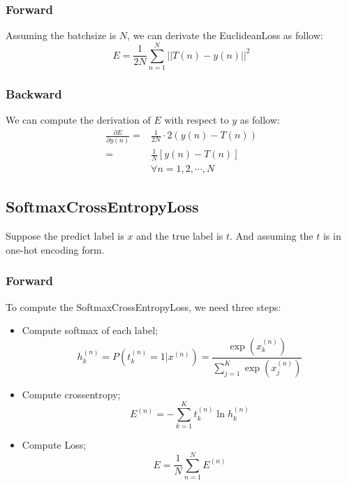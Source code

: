 \documentclass{elegantbook}
\begin{document}
\subsubsection{Forward}
Assuming the batchsize is $N$, we can derivate the EuclideanLoss as follow:
\begin{equation}
E=\frac{1}{2N}\sum_{n=1}^{N}\left||T(n)-y(n)|\right|^2
\end{equation}
\subsubsection{Backward}
We can compute the derivation of $E$ with respect to $y$ as follow:
\begin{equation}
\begin{aligned}
\frac{\partial E}{\partial y(n)}=&\frac{1}{2N}\cdot 2(y(n)-T(n)) \\
=&\frac{1}{N}\left[y(n)-T(n)\right] \\
&\forall n=1,2,\cdots,N
\end{aligned}
\end{equation}

\subsection{SoftmaxCrossEntropyLoss}
Suppose the predict label is $x$ and the true label is $t$. And assuming the $t$ is in one-hot encoding form. 

\subsubsection{Forward}
To compute the SoftmaxCrossEntropyLoss, we need three steps:
\begin{itemize}
	\item Compute softmax of each label;
	\begin{equation}
	h_k^{(n)}=P(t_k^{(n)}=1|x^{(n)})=\dfrac{\exp(x_k^{(n)})}{\sum_{j=1}^{K}\exp(x_j^{(n)})}
	\end{equation}
	\item Compute crossentropy;
	\begin{equation}
	E^{(n)}=-\sum_{k=1}^{K}t_k^{(n)}\ln h_k^{(n)}
	\end{equation}
	\item Compute Loss;
	\begin{equation}
	E=\frac{1}{N}\sum_{n=1}^{N}E^{(n)}
	\end{equation}
\end{itemize}
\end{document}
